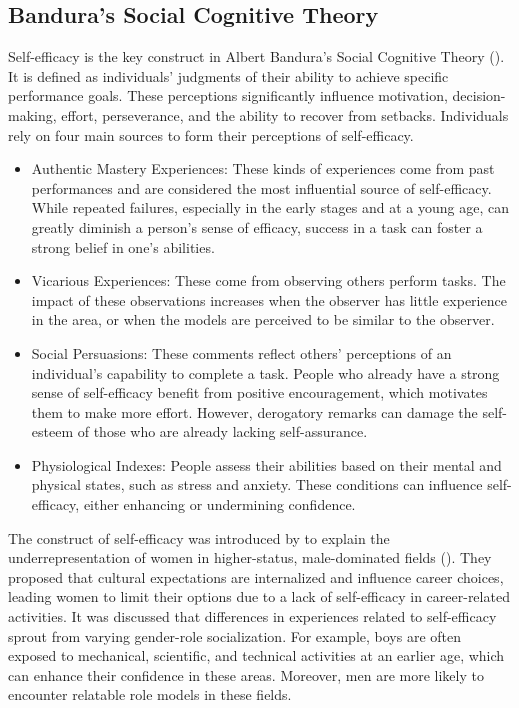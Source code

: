 \subsection{Bandura's Social Cognitive Theory}
Self-efficacy is the key construct in Albert Bandura's Social Cognitive Theory (\cite{Zel,Bandura2001}). It is defined as individuals' judgments of their ability to achieve specific performance goals. These perceptions significantly influence motivation, decision-making, effort, perseverance, and the ability to recover from setbacks.
Individuals rely on four main sources to form their perceptions of self-efficacy.
\begin{itemize}
    \item Authentic Mastery Experiences: These kinds of experiences come from past performances and are considered the most influential source of self-efficacy. While repeated failures, especially in the early stages and at a young age, can greatly diminish a person's sense of efficacy, success in a task can foster a strong belief in one’s abilities.
    \item Vicarious Experiences: These come from observing others perform tasks. The impact of these observations increases when the observer has little experience in the area, or when the models are perceived to be similar to the observer.
    \item Social Persuasions: These comments reflect others' perceptions of an individual's capability to complete a task. People who already have a strong sense of self-efficacy benefit from positive encouragement, which motivates them to make more effort. However, derogatory remarks can damage the self-esteem of those who are already lacking self-assurance.
    \item Physiological Indexes: People assess their abilities based on their mental and physical states, such as stress and anxiety. These conditions can influence self-efficacy, either enhancing or undermining confidence.
\end{itemize}
The construct of self-efficacy was introduced by \textcite{HACKETT1981326} to explain the underrepresentation of women in higher-status, male-dominated fields (\cite{Zel}). They proposed that cultural expectations are internalized and influence career choices, leading women to limit their options due to a lack of self-efficacy in career-related activities. It was discussed that differences in experiences related to self-efficacy sprout from varying gender-role socialization. For example, boys are often exposed to mechanical, scientific, and technical activities at an earlier age, which can enhance their confidence in these areas. Moreover, men are more likely to encounter relatable role models in these fields.


